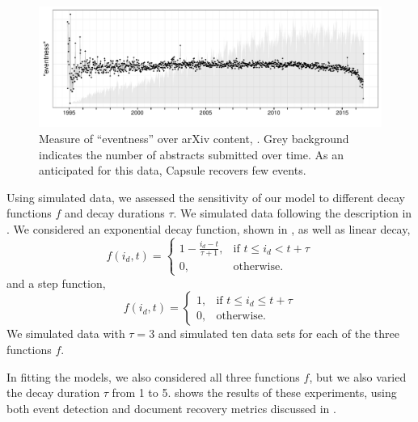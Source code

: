 \begin{figure}[ht]
\centering
\includegraphics[width=\linewidth]{fig/arxiv_events.pdf}
\caption{Measure of ``eventness'' over arXiv content, .  Grey background indicates the number of abstracts submitted over time.  As an anticipated for this data, Capsule recovers few events.}
\label{fig:arxiv_events}
\end{figure}

  Using simulated data, we assessed the sensitivity of our model to different decay functions $f$ and decay durations $\tau$.  We simulated data following the description in .  We considered an exponential decay function, shown in , as well as linear decay,
\begin{equation}
f(i_d, t) = 
\begin{cases}
    1 - \frac{i_d - t}{\tau + 1},			& \text{if } t \le i_d < t+\tau  \\
    0,          & \text{otherwise.}
\end{cases}
\label{eq:flinear}
\end{equation}
and a step function,
\begin{equation}
f(i_d, t) = 
\begin{cases}
    1,			& \text{if } t \le i_d \le t+\tau  \\
    0,          & \text{otherwise.}
\end{cases}
\label{eq:fstep}
\end{equation}
We simulated data with $\tau=3$ and simulated ten data sets for each of the three functions $f$.

In fitting the models, we also considered all three functions $f$, but we also varied the decay duration $\tau$ from 1 to 5.   shows the results of these experiments, using both event detection and document recovery metrics discussed in .

